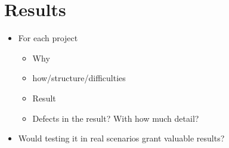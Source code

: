 \newpage
\section{Results}


\begin{itemize}
  \item For each project
  \begin{itemize}
    \item Why
    \item how/structure/difficulties
    \item Result
    \item Defects in the result? With how much detail?
  \end{itemize}
  \item Would testing it in real scenarios grant valuable results?
\end{itemize}
